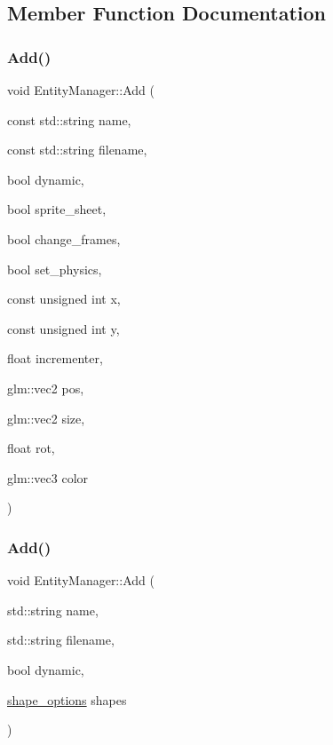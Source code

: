 \subsection{Member Function Documentation}
\mbox{\label{classEntityManager_a8724955e17641352db006a0050205d6d}} 
\subsubsection{\texorpdfstring{Add()}{Add()}\hspace{0.1cm}{\footnotesize\ttfamily [1/2]}}
{\footnotesize\ttfamily void Entity\+Manager\+::\+Add (\begin{DoxyParamCaption}\item[{const std\+::string}]{name,  }\item[{const std\+::string}]{filename,  }\item[{bool}]{dynamic,  }\item[{bool}]{sprite\+\_\+sheet,  }\item[{bool}]{change\+\_\+frames,  }\item[{bool}]{set\+\_\+physics,  }\item[{const unsigned int}]{x,  }\item[{const unsigned int}]{y,  }\item[{float}]{incrementer,  }\item[{glm\+::vec2}]{pos,  }\item[{glm\+::vec2}]{size,  }\item[{float}]{rot,  }\item[{glm\+::vec3}]{color }\end{DoxyParamCaption})}

\mbox{\label{classEntityManager_a4d99f8a7949e50136c4665c2c53b31b3}} 
\subsubsection{\texorpdfstring{Add()}{Add()}\hspace{0.1cm}{\footnotesize\ttfamily [2/2]}}
{\footnotesize\ttfamily void Entity\+Manager\+::\+Add (\begin{DoxyParamCaption}\item[{std\+::string}]{name,  }\item[{std\+::string}]{filename,  }\item[{bool}]{dynamic,  }\item[{\hyperlink{entity__manager_8h_ad272ece963b9cc856176573f48fc6554}{shape\+\_\+options}}]{shapes }\end{DoxyParamCaption})}

